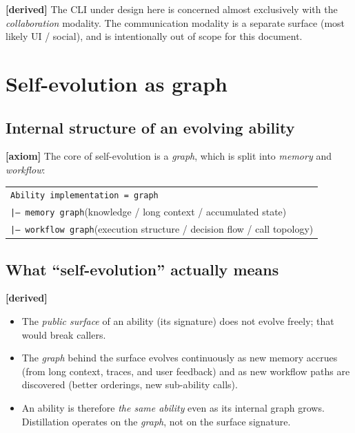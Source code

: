 \documentclass[11pt,a4paper]{article}
\newcommand{\axiom}{\textcolor{axiomcolor}{\textbf{[axiom]}}\xspace}
\newcommand{\derived}{\textcolor{derivedcolor}{\textbf{[derived]}}\xspace}
\begin{document}
\derived{} The CLI under design here is concerned almost exclusively with the
\emph{collaboration} modality. The communication modality is a separate
surface (most likely UI / social), and is intentionally out of scope for this
document.

\section{Self-evolution as graph}
\label{sec:graph}

\subsection{Internal structure of an evolving ability}

\axiom{} The core of self-evolution is a \emph{graph}, which is split into
\emph{memory} and \emph{workflow}:

\begin{center}
\begin{tabular}{l}
\texttt{Ability implementation = graph} \\
\quad\texttt{|-- memory graph}\quad (knowledge / long context / accumulated state) \\
\quad\texttt{|-- workflow graph}\quad (execution structure / decision flow / call topology) \\
\end{tabular}
\end{center}

\subsection{What ``self-evolution'' actually means}

\derived{}
\begin{itemize}[leftmargin=2em,itemsep=0.3em]
    \item The \emph{public surface} of an ability (its signature) does not
    evolve freely; that would break callers.
    \item The \emph{graph} behind the surface evolves continuously as new
    memory accrues (from long context, traces, and user feedback) and as new
    workflow paths are discovered (better orderings, new sub-ability calls).
    \item An ability is therefore \emph{the same ability} even as its internal
    graph grows. Distillation operates on the \emph{graph}, not on the surface
    signature.
\end{itemize}
\end{document}
